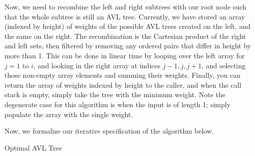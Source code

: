 \documentclass[12pt]{article}
\begin{document}
Now, we need to recombine the left and right subtrees with our root node such that the whole subtree is still an AVL tree. Currently, we have stored an array (indexed by height) of weights of the possible AVL trees created on the left, and the same on the right. The recombination is the Cartesian product of the right and left sets, then filtered by removing any ordered pairs that differ in height by more than 1. This can be done in linear time by looping over the left array for $j = 1 \text{ to } i$, and looking in the right array at indices $j-1, j, j+1$, and selecting those non-empty array elements and summing their weights. Finally, you can return the array of weights indexed by height to the caller, and when the call stack is empty, simply take the tree with the minimum weight. Note the degenerate case for this algorithm is when the input is of length 1; simply populate the array with the single weight.

Now, we formalize our iterative specification of the algorithm below.

\begin{algorithm}
\DontPrintSemicolon
{}

\caption{Optimal AVL Tree \label{AVL}}
\end{algorithm}
\end{document}
